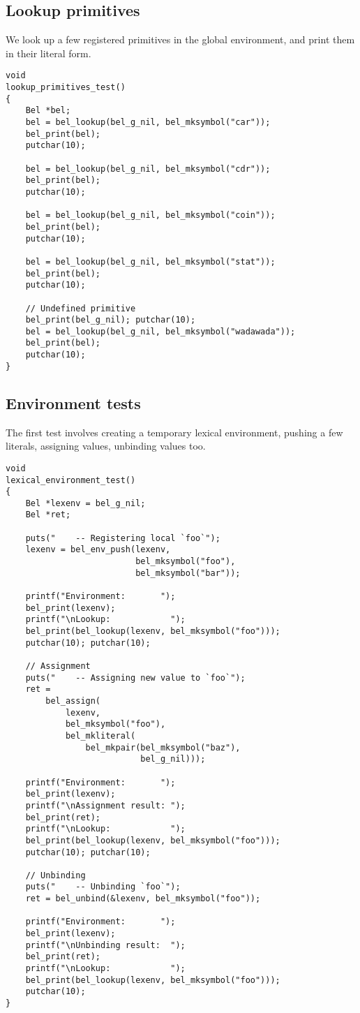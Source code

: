 \documentclass[openright,a4paper,twoside,12pt]{memoir}
\begin{document}
\subsection{Lookup primitives}
\label{sec:org94d3844}

We look up a few registered primitives in the global environment, and
print them in their literal form.

\begin{verbatim}
void
lookup_primitives_test()
{
    Bel *bel;
    bel = bel_lookup(bel_g_nil, bel_mksymbol("car"));
    bel_print(bel);
    putchar(10);

    bel = bel_lookup(bel_g_nil, bel_mksymbol("cdr"));
    bel_print(bel);
    putchar(10);

    bel = bel_lookup(bel_g_nil, bel_mksymbol("coin"));
    bel_print(bel);
    putchar(10);
    
    bel = bel_lookup(bel_g_nil, bel_mksymbol("stat"));
    bel_print(bel);
    putchar(10);

    // Undefined primitive
    bel_print(bel_g_nil); putchar(10);
    bel = bel_lookup(bel_g_nil, bel_mksymbol("wadawada"));
    bel_print(bel);
    putchar(10);
}
\end{verbatim}

\subsection{Environment tests}
\label{sec:org28e5f7f}

The first test involves creating a temporary lexical environment,
pushing a few literals, assigning values, unbinding values too.

\begin{verbatim}
void
lexical_environment_test()
{
    Bel *lexenv = bel_g_nil;
    Bel *ret;

    puts("    -- Registering local `foo`");
    lexenv = bel_env_push(lexenv,
                          bel_mksymbol("foo"),
                          bel_mksymbol("bar"));
    
    printf("Environment:       ");
    bel_print(lexenv);
    printf("\nLookup:            ");
    bel_print(bel_lookup(lexenv, bel_mksymbol("foo")));
    putchar(10); putchar(10);

    // Assignment
    puts("    -- Assigning new value to `foo`");
    ret =
        bel_assign(
            lexenv,
            bel_mksymbol("foo"),
            bel_mkliteral(
                bel_mkpair(bel_mksymbol("baz"),
                           bel_g_nil)));

    printf("Environment:       ");
    bel_print(lexenv);
    printf("\nAssignment result: ");
    bel_print(ret);
    printf("\nLookup:            ");
    bel_print(bel_lookup(lexenv, bel_mksymbol("foo")));
    putchar(10); putchar(10);

    // Unbinding
    puts("    -- Unbinding `foo`");
    ret = bel_unbind(&lexenv, bel_mksymbol("foo"));
    
    printf("Environment:       ");
    bel_print(lexenv);
    printf("\nUnbinding result:  ");
    bel_print(ret);
    printf("\nLookup:            ");
    bel_print(bel_lookup(lexenv, bel_mksymbol("foo")));
    putchar(10);
}
\end{verbatim}
\end{document}
